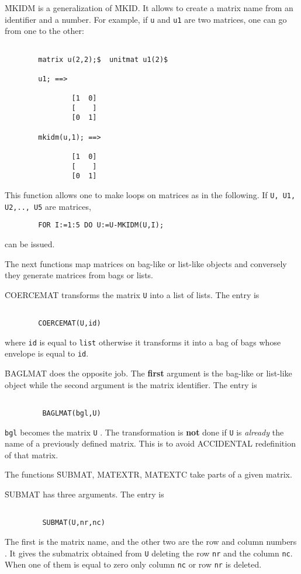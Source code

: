 \f{MKIDM} is a generalization of \f{MKID}. It allows to create a matrix name
from an identifier and a number.  For example, if \verb+u+ and \verb+u1+
are two matrices, one can go from one to the other:
\begin{verbatim}

        matrix u(2,2);$  unitmat u1(2)$

        u1; ==>

                [1  0]
                [    ]
                [0  1]

        mkidm(u,1); ==>

                [1  0]
                [    ]
                [0  1]
\end{verbatim}
This function allows one to make loops on matrices as in the following.
If \verb+U, U1, U2,.., U5+ are matrices,
\begin{verbatim}
        FOR I:=1:5 DO U:=U-MKIDM(U,I);
\end{verbatim}
can be issued.
\item[ii.]
The next functions map matrices on bag-like or list-like objects
and conversely  they generate matrices from bags or lists.

\f{COERCEMAT} transforms the matrix \verb+U+ into a list of lists.
The entry is
\begin{verbatim}

        COERCEMAT(U,id)

\end{verbatim}
where \verb+id+ is equal to \verb+list+ otherwise it transforms it into
a bag of bags whose envelope is equal to \verb+id+.

\f{BAGLMAT} does the opposite job. The {\bf first} argument is the
bag-like or list-like object while the second argument is the matrix
identifier. The entry is
\begin{verbatim}

         BAGLMAT(bgl,U)

\end{verbatim}
\verb+bgl+ becomes the matrix \verb+U+ . The transformation is
{\bf not} done if \verb+U+  is {\em already} the  name of a
previously  defined matrix. This is to avoid ACCIDENTAL redefinition
of that matrix.
\item[ii.]
The functions \f{SUBMAT, MATEXTR, MATEXTC} take parts of a given matrix.

\f{SUBMAT} has three arguments. The entry is
\begin{verbatim}

         SUBMAT(U,nr,nc)

\end{verbatim}
The first is the matrix name, and the other two are the row  and column
numbers .  It gives the
submatrix obtained from \verb+U+ deleting the row \verb+nr+ and
the column \verb+nc+.
When one of them is equal to zero only column \verb+nc+
or row \verb+nr+ is deleted.

